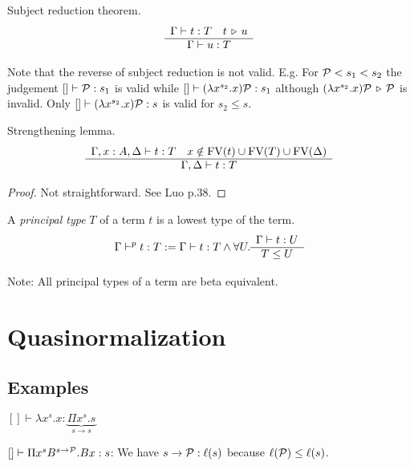 \begin{theorem}
  Subject reduction theorem.
  $$
  \begin{array}{c} \Gamma \vdash t : T  \quad t \,\triangleright\, u \\ \hline \Gamma \vdash u : T\end{array}
  $$
\end{theorem}

Note that the reverse of subject reduction is not valid. E.g. For
${\cal P} < s_1 < s_2$ the judgement
%
$[] \vdash {\cal P}: s_1$ is valid while
%
$[] \vdash (\lambda x^{s_2}. x) {\cal P} : s_1$
%
although $(\lambda x^{s_2}. x) {\cal P} \,\triangleright\, {\cal P}$ is invalid.
%
Only
%
$[] \vdash (\lambda x^{s_2}. x) {\cal P} : s$
%
is valid for $s_2 \le s$.




\begin{lemma}
  Strengthening lemma.
  $$
  \begin{array}{c} \Gamma,x:A,\Delta \vdash t:T
    \quad
    x \notin \text{FV}(t) \cup \text{FV}(T) \cup \text{FV}(\Delta) \\ \hline \Gamma,\Delta \vdash t : T\end{array}
  $$
  \begin{proof}
    Not straightforward. See Luo p.38.
  \end{proof}
\end{lemma}



\begin{definition}
  A \emph{principal type}
  $T$ of a term $t$ is a lowest type of the term.
  $$
  \Gamma \vdash^p t: T :=
  \Gamma \vdash t :T \land
  \forall U. \begin{array}{c} \Gamma \vdash t: U \\ \hline T \le U\end{array}
  $$
\end{definition}
%
Note: All principal types of a term are beta equivalent.












\section{Quasinormalization}

\subsection {Examples}

$
[] \vdash \lambda x^s.x : \underbrace{\Pi x^s. s}_{s \to s}
$


$[] \vdash \Pi x^s B^{s \to {\cal P}}. B x : s$: We have $s \to {\cal P}: \ell(s)$
because $\ell({\cal P}) \le \ell(s)$.






